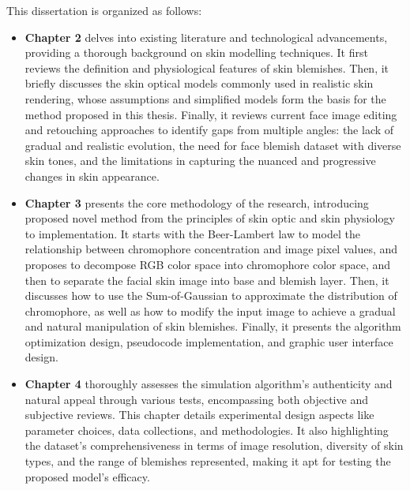 \begin{spacing}{1.5}
This dissertation is organized as follows:
\begin{itemize}
    \item \textbf{Chapter 2} delves into existing literature and technological advancements, providing a thorough background on skin modelling techniques. It first reviews the definition and physiological features of skin blemishes. Then, it briefly discusses the skin optical models commonly used in realistic skin rendering, whose assumptions and simplified models form the basis for the method proposed in this thesis. Finally, it reviews current face image editing and retouching approaches to identify gaps from multiple angles: the lack of gradual and realistic evolution, the need for face blemish dataset with diverse skin tones, and the limitations in capturing the nuanced and progressive changes in skin appearance.
    \item \textbf{Chapter 3} presents the core methodology of the research, introducing proposed novel method from the principles of skin optic and skin physiology to implementation. It starts with the Beer-Lambert law to model the relationship between chromophore concentration and image pixel values, and proposes to decompose RGB color space into chromophore color space, and then to separate the facial skin image into base and blemish layer. Then, it discusses how to use the Sum-of-Gaussian to approximate the distribution of chromophore, as well as how to modify the input image to achieve a gradual and natural manipulation of skin blemishes. Finally, it presents the algorithm optimization design, pseudocode implementation, and graphic user interface design.
    \item \textbf{Chapter 4} thoroughly assesses the simulation algorithm's authenticity and natural appeal through various tests, encompassing both objective and subjective reviews. This chapter details experimental design aspects like parameter choices, data collections, and methodologies. It also highlighting the dataset's comprehensiveness in terms of image resolution, diversity of skin types, and the range of blemishes represented, making it apt for testing the proposed model's efficacy.

\end{itemize}
\end{spacing}
